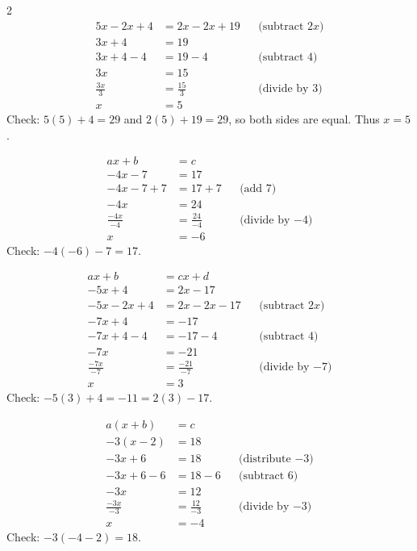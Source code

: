 \begin{multicols}{2}
		\begin{align*}
			5x-2x+4&=2x-2x+19 &&\text{(subtract $2x$)}\\
			3x+4&=19\\
			3x+4-4&=19-4 &&\text{(subtract 4)}\\
			3x&=15\\
			\frac{3x}{3}&=\frac{15}{3} &&\text{(divide by 3)}\\
			x&=5
		\end{align*}
		Check: $5(5)+4=29$ and $2(5)+19=29$, so both sides are equal. Thus $x=5$.
		
		
		\begin{align*}
			ax+b&=c \\ 
			-4x-7&=17 \\
			-4x-7+7&=17+7 &&\text{(add 7)}\\
			-4x&=24\\
			\frac{-4x}{-4}&=\frac{24}{-4} &&\text{(divide by $-4$)}\\
			x&=-6
		\end{align*}
		\vspace{-4mm}
		Check: $-4(-6)-7=17$.
		\vspace{5mm}
		
		\begin{align*}
			ax+b&=cx+d \\
			-5x+4&=2x-17 \\
			-5x-2x+4&=2x-2x-17 &&\text{(subtract $2x$)}\\
			-7x+4&=-17\\
			-7x+4-4&=-17-4 &&\text{(subtract 4)}\\
			-7x&=-21\\
			\frac{-7x}{-7}&=\frac{-21}{-7} &&\text{(divide by $-7$)}\\
			x&=3
		\end{align*}
		\vspace{-4mm}
		Check: $-5(3)+4=-11=2(3)-17$.
		\vspace{5mm}
		
		\begin{align*}
			a(x+b)&=c \\
			-3(x-2)&=18 \\
			-3x+6&=18 &&\text{(distribute $-3$)}\\
			-3x+6-6&=18-6 &&\text{(subtract 6)}\\
			-3x&=12\\
			\frac{-3x}{-3}&=\frac{12}{-3} &&\text{(divide by $-3$)}\\
			x&=-4
		\end{align*}
		\vspace{-4mm}
		Check: $-3(-4-2)=18$.
		\vspace{5mm}
		

\end{multicols}
